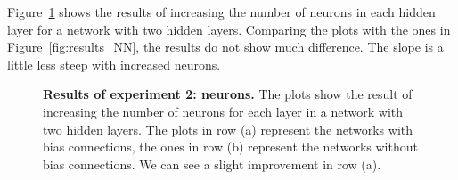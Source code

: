 Figure~\ref{fig:experiment_2_neurons} shows the results of increasing the number of neurons in each hidden layer for a network with two hidden layers. Comparing the plots with the ones in Figure~\ref{fig:results_NN}, the results do not show much difference. The slope is a little less steep with increased neurons.
\begin{figure}[!ht]
\begin{figrow}
\item \label{row:NN_with_bias_neurons} 
\item \label{row:NN_without_neurons}  
\end{figrow}
\caption[Results of experiment 2: neurons]{
  \textbf{Results of experiment 2: neurons.}
  The plots show the result of increasing the number of neurons for each layer in a network with two hidden layers. The plots in row (a) represent the networks with bias connections, the ones in row (b) represent the networks without bias connections. We can see a slight improvement in row (a).
}
\label{fig:experiment_2_neurons}
\end{figure}


\clearpage
